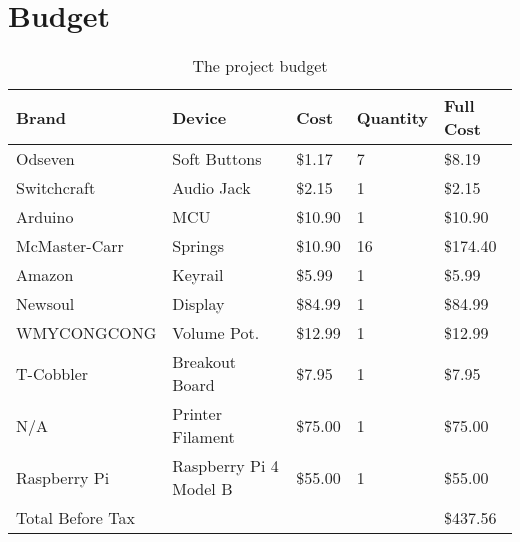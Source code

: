 \section{Budget}
\begin{table}[h!]
  \centering
  \begin{tabular}{|l|l|l|l|l|}
    \hline
    Brand            & Device                 & Cost    & Quantity & Full Cost \\ \hline
    Odseven          & Soft Buttons           & \$1.17  & 7        & \$8.19    \\ \hline
    Switchcraft      & Audio Jack             & \$2.15  & 1        & \$2.15    \\ \hline
    Arduino          & MCU                    & \$10.90 & 1        & \$10.90   \\ \hline
    McMaster-Carr    & Springs                & \$10.90 & 16       & \$174.40  \\ \hline
    Amazon           & Keyrail                & \$5.99  & 1        & \$5.99    \\ \hline
    Newsoul          & Display                & \$84.99 & 1        & \$84.99   \\ \hline
    WMYCONGCONG      & Volume Pot.            & \$12.99 & 1        & \$12.99   \\ \hline
    T-Cobbler        & Breakout Board         & \$7.95  & 1        & \$7.95    \\ \hline
    N/A              & Printer Filament       & \$75.00 & 1        & \$75.00   \\ \hline
    Raspberry Pi     & Raspberry Pi 4 Model B & \$55.00 & 1        & \$55.00   \\ \hline
    Total Before Tax &                        &         &          & \$437.56  \\ \hline
  \end{tabular}
  \caption{The project budget}
  \label{Tab:budget}
\end{table}
